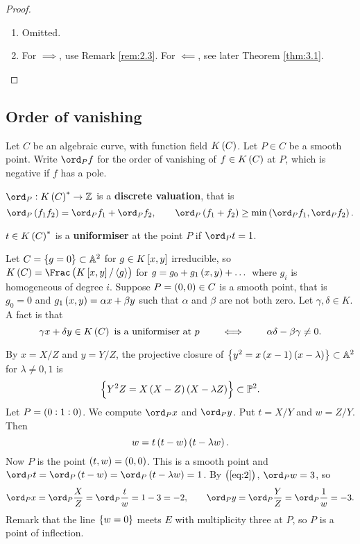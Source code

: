 \begin{proof}
\hfill
\begin{enumerate}
\item Omitted.
\item For $ \implies $, use Remark \ref{rem:2.3}. For $ \impliedby $, see later Theorem \ref{thm:3.1}.
\end{enumerate}
\end{proof}

\subsection{Order of vanishing}

Let $ C $ be an algebraic curve, with function field $ K\br{C} $. Let $ P \in C $ be a smooth point. Write $ \ord_P f $ for the order of vanishing of $ f \in K\br{C} $ at $ P $, which is negative if $ f $ has a pole.

\begin{fact*}
$ \ord_P : K\br{C}^* \to \ZZ $ is a \textbf{discrete valuation}, that is
$$ \ord_P \br{f_1f_2} = \ord_P f_1 + \ord_P f_2, \qquad \ord_P \br{f_1 + f_2} \ge \min\br{\ord_P f_1, \ord_P f_2}. $$
\end{fact*}

\begin{definition*}
$ t \in K\br{C}^* $ is a \textbf{uniformiser} at the point $ P $ if $ \ord_P t = 1 $.
\end{definition*}

\pagebreak

\begin{example}
Let $ C = \cbr{g = 0} \subset \AA^2 $ for $ g \in K\sbr{x, y} $ irreducible, so $ K\br{C} = \Frac \br{K\sbr{x, y} / \abr{g}} $ for $ g = g_0 + g_1\br{x, y} + \dots $ where $ g_i $ is homogeneous of degree $ i $. Suppose $ P = \br{0, 0} \in C $ is a smooth point, that is $ g_0 = 0 $ and $ g_1\br{x, y} = \alpha x + \beta y $ such that $ \alpha $ and $ \beta $ are not both zero. Let $ \gamma, \delta \in K $. A fact is that
$$ \gamma x + \delta y \in K\br{C} \ \text{is a uniformiser at} \ p \qquad \iff \qquad \alpha\delta - \beta\gamma \ne 0. $$
\end{example}

\begin{example}
\label{eg:2.6}
By $ x = X / Z $ and $ y = Y / Z $, the projective closure of $ \cbr{y^2 = x\br{x - 1}\br{x - \lambda}} \subset \AA^2 $ for $ \lambda \ne 0, 1 $ is
$$ \cbr{Y^2Z = X\br{X - Z}\br{X - \lambda Z}} \subset \PP^2. $$
Let $ P = \br{0 : 1 : 0} $. We compute $ \ord_P x $ and $ \ord_P y $. Put $ t = X / Y $ and $ w = Z / Y $. Then
\begin{equation}
\label{eq:2}
w = t\br{t - w}\br{t - \lambda w}.
\end{equation}
Now $ P $ is the point $ \br{t, w} = \br{0, 0} $. This is a smooth point and $ \ord_P t = \ord_P \br{t - w} = \ord_P \br{t - \lambda w} = 1 $. By $ \br{\ref{eq:2}} $, $ \ord_P w = 3 $, so
$$ \ord_P x = \ord_P \dfrac{X}{Z} = \ord_P \dfrac{t}{w} = 1 - 3 = -2, \qquad \ord_P y = \ord_P \dfrac{Y}{Z} = \ord_P \dfrac{1}{w} = -3. $$
Remark that the line $ \cbr{w = 0} $ meets $ E $ with multiplicity three at $ P $, so $ P $ is a point of inflection.
\end{example}

